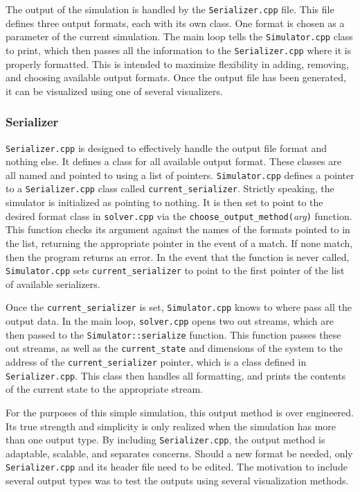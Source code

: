 \documentclass[a4paper,11pt]{article}
\begin{document}
The output of the simulation is handled by the \texttt{Serializer.cpp} file.  This file defines three output formats, each with its own class.  One format is chosen as a parameter of the current simulation.  The main loop tells the \texttt{Simulator.cpp} class to print, which then passes all the information to the \texttt{Serializer.cpp} where it is properly formatted.   This is intended to maximize flexibility in adding, removing, and choosing available output formats.  Once the output file has been generated, it can be visualized using one of several visualizers.

\subsubsection{Serializer}

\texttt{Serializer.cpp} is designed to effectively handle the output file format and nothing else.  It defines a class for all available output format.  These classes are all named and pointed to using a list of pointers.  \texttt{Simulator.cpp} defines a pointer to a \texttt{Serializer.cpp} class called \texttt{current\_serializer}.  Strictly speaking, the simulator is initialized as pointing to nothing.  It is then set to point to the desired format class in \texttt{solver.cpp} via the \texttt{choose\_output\_method(}\emph{arg}\texttt{)} function.  This function checks its argument against the names of the formats pointed to in the list, returning the appropriate pointer in the event of a match.  If none match, then the program returns an error.  In the event that the function is never called, \texttt{Simulator.cpp} sets \texttt{current\_serializer} to point to the first pointer of the list of available serializers.  

Once the  \texttt{current\_serializer} is set, \texttt{Simulator.cpp}  knows to where pass all the output data.  In the main loop, \texttt{solver.cpp}  opens two out streams, which are then passed to the \texttt{Simulator::serialize} function.  This function passes these out streams, as well as the \texttt{current\_state} and dimensions of the system to the address of the \texttt{current\_serializer} pointer, which is a class defined in \texttt{Serializer.cpp}.  This class then handles all formatting, and prints the contents of the current state to the appropriate stream.

For the purposes of this simple simulation, this output method is over engineered.  Its true strength and simplicity is only realized when the simulation has more than one output type.  By including \texttt{Serializer.cpp}, the output method is adaptable, scalable, and separates concerns.  Should a new format be needed, only \texttt{Serializer.cpp} and its header file need to be edited.  The motivation to include several output types was to test the outputs using several visualization methods.
\end{document}

